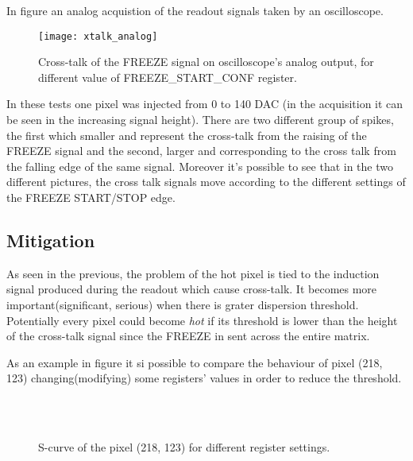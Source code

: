 
In figure  an analog acquistion of the readout signals taken by an oscilloscope.


\begin{figure}
\centering
\texttt{[image: xtalk\_analog]}
\caption{Cross-talk of the \textsc{FREEZE} signal on oscilloscope's analog output, for different value of \textsc{FREEZE\_START\_CONF} register.}
\label{fig:analog_xtalk}
\end{figure}

In these tests one pixel was injected from 0 to 140 DAC (in the acquisition it can be seen in the increasing signal height). There are two different group of spikes, the first which smaller and represent the cross-talk from the raising of the \textsc{FREEZE} signal and the second, larger and corresponding to the cross talk from the falling edge of the same signal.
Moreover it's possible to see that in the two different pictures, the cross talk signals move according to the different settings of the \textsc{FREEZE START/STOP} edge.



\subsection{Mitigation}

As seen in the previous, the problem of the hot pixel is tied to the induction signal produced during the readout which cause cross-talk. It becomes more important(significant, serious) when there is grater dispersion threshold.\\

Potentially every pixel could become \textit{hot} if its threshold is lower than the height of the cross-talk signal since the \textsc{FREEZE} in sent across the entire matrix. 

As an example in figure  it si possible to compare the behaviour of pixel (218, 123) changing(modifying) some registers' values in order to reduce the threshold.

\begin{figure}[h!]
\centering
{}\quad
{}\\
\\
\caption{S-curve of the pixel (218, 123) for different register settings.}
\label{fig:making_hot}
\end{figure}

